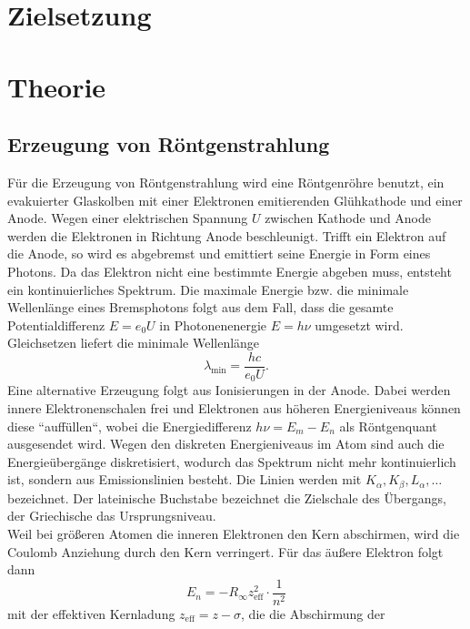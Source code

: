 \section*{Zielsetzung}
\label{sec:Zielsetzung}
%
\section{Theorie}
\label{sec:Theorie}
%
\subsection{Erzeugung von Röntgenstrahlung}
\label{sec:Erzeugung von Röntgenstrahlung}
Für die Erzeugung von Röntgenstrahlung wird eine Röntgenröhre benutzt, ein evakuierter
Glaskolben mit einer Elektronen emitierenden Glühkathode und einer Anode. Wegen einer
elektrischen Spannung $U$ zwischen Kathode und Anode werden die Elektronen in Richtung Anode
beschleunigt. Trifft ein Elektron auf die Anode, so wird es abgebremst und emittiert seine
Energie in Form eines Photons. Da das Elektron nicht eine bestimmte Energie abgeben muss,
entsteht ein kontinuierliches Spektrum. Die maximale Energie bzw. die minimale Wellenlänge
eines Bremsphotons folgt aus dem Fall, dass die gesamte Potentialdifferenz $E = e_0 U$ in
Photonenenergie $E = h\nu$ umgesetzt wird. Gleichsetzen liefert die minimale Wellenlänge
\begin{equation}
	\label{eqn:lambda_min}
	\lambda_\text{min} = \frac{hc}{e_0 U}.
\end{equation}
Eine alternative Erzeugung folgt aus Ionisierungen in der Anode. Dabei werden innere
Elektronenschalen frei und Elektronen aus höheren Energieniveaus können diese
``auffüllen``, wobei die Energiedifferenz $h\nu = E_m - E_n$ als Röntgenquant
ausgesendet wird. Wegen den diskreten Energieniveaus im Atom sind auch die
Energieübergänge diskretisiert, wodurch das Spektrum nicht mehr kontinuierlich ist,
sondern aus Emissionslinien besteht. Die Linien werden mit $K_\alpha, K_\beta, L_\alpha,
\hdots$ bezeichnet. Der lateinische Buchstabe bezeichnet die Zielschale des Übergangs, der
Griechische das Ursprungsniveau. 
\\
Weil bei größeren Atomen die inneren Elektronen den Kern abschirmen, wird die Coulomb
Anziehung durch den Kern verringert. Für das äußere Elektron folgt dann
\begin{equation}
	E_n = - R_\infty z_\text{eff}^2 \cdot \frac{1}{n^2}
\end{equation}
mit der effektiven Kernladung $z_\text{eff} = z - \sigma$, die die Abschirmung der
